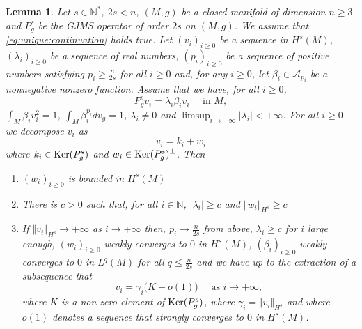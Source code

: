 \documentclass[10pt]{amsart}
\numberwithin{equation}{section}
\def\ker{{\mathop{\rm Ker}}}
\theoremstyle{plain}
\newtheorem{lemme}{Lemma}[section]%
\theoremstyle{remark}
\begin{document}
\begin{lemme} \label{lem:mainlemma} Let $s \in \mathbb{N}^*$, $2s <n$, $(M,g)$ be a closed manifold of dimension $n \ge 3$ and $P_g^s$ be the GJMS operator of order $2s$ on $(M,g)$. We assume that \eqref{eq:unique:continuation} holds true. Let $(v_i)_{i \ge0}$ be a sequence in $H^s(M)$, $(\lambda_i)_{i\ge0}$ be a sequence of real numbers, $(p_i)_{i \ge0}$ be a sequence of positive numbers satisfying $p_i \ge \frac{n}{2s}$ for all $i \ge 0$ and, for any $i \ge0$, let $\beta_i \in \mathcal{A}_{p_i}$ be a nonnegative nonzero function. Assume that we have, for all $i \ge 0$, 
\begin{equation}  \label{eq:vecteursvi}
 P_g^s v_i = \lambda_i \beta_i v_i  \quad \text{ in } M, 
 \end{equation}
 $ \int_M \beta_i v_i^2 = 1$, $\int_{M} \beta_i^{p_i} dv_g = 1$, $\lambda_i\neq 0$ and $\limsup_{i\to +\infty} \vert \lambda_i \vert < +\infty$. For all $i \ge 0$ we decompose $v_i$ as 
 $$ v_i = k_i + w_i $$
where $k_i \in \ker(P_g^s)$ and $w_i \in \ker(P_g^s)^{\perp}$. Then 
\begin{enumerate}
\item $ ( w_i )_{i \ge0} $ is bounded in $H^s(M)$
\item There is $c>0$ such that, for all $i\in \mathbb{N}$, $\left\vert \lambda_i \right\vert \geq c$ and $\Vert w_i \Vert_{H^s} \ge c$
\item If $\Vert v_i \Vert_{H^s} \to +\infty$ as $i\to +\infty$ then, $p_i \to \frac{n}{2s}$ from above, $\lambda_i \geq c$ for $i$ large enough, $(w_i)_{i \ge0}$ weakly converges to $0$ in $H^s(M)$, $(\beta_i)_{i \ge0}$ weakly converges to $0$ in $L^q(M)$ for all $q \leq \frac{n}{2s}$ and we have up to the extraction of a subsequence that
$$ v_i = \gamma_i \big(K + o(1) \big) \quad \text{ as } i \to + \infty,$$
where $K$ is a non-zero element of $\ker(P_g^s)$, where $\gamma_i = \Vert v_i \Vert_{H^s}$ and where $o(1)$ denotes a sequence that strongly converges to $0$ in $H^s(M)$.
\end{enumerate}
\end{lemme}
\end{document}
